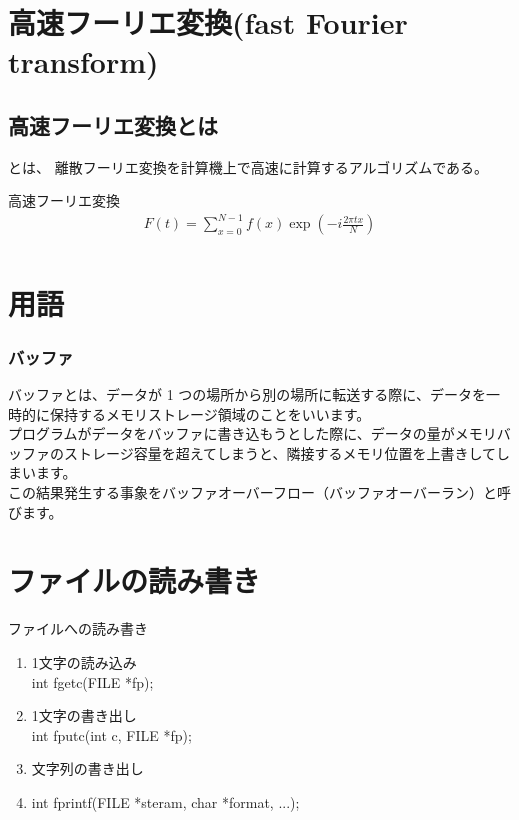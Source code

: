\documentclass[a4paper]{jsarticle}
\begin{document}
\section{高速フーリエ変換(fast Fourier transform)}
\subsection{高速フーリエ変換とは}
とは、
離散フーリエ変換を計算機上で高速に計算するアルゴリズムである。
\begin{itembox}[l]{高速フーリエ変換}
    \begin{eqnarray*}
        F\left(t\right) = \sum^{N-1}_{x=0}f\left(x\right) \exp\left(-i\frac{2 \pi tx}{N}\right)\\
    \end{eqnarray*}
\end{itembox}

\section{用語}
\subsubsection*{バッファ}
バッファとは、データが 1 つの場所から別の場所に転送する際に、データを一時的に保持するメモリストレージ領域のことをいいます。\\
プログラムがデータをバッファに書き込もうとした際に、データの量がメモリバッファのストレージ容量を超えてしまうと、隣接するメモリ位置を上書きしてしまいます。\\
この結果発生する事象をバッファオーバーフロー（バッファオーバーラン）と呼びます。\\
\section{ファイルの読み書き}

\begin{itembox}[l]{ファイルへの読み書き}
    \begin{enumerate}[(1)]
        \item 1文字の読み込み\\
              int fgetc(FILE *fp);
        \item 1文字の書き出し\\
              int fputc(int c, FILE *fp);
        \item 文字列の書き出し\\
        \item int fprintf(FILE *steram, char *format, ...);
    \end{enumerate}
\end{itembox}
\end{document}
